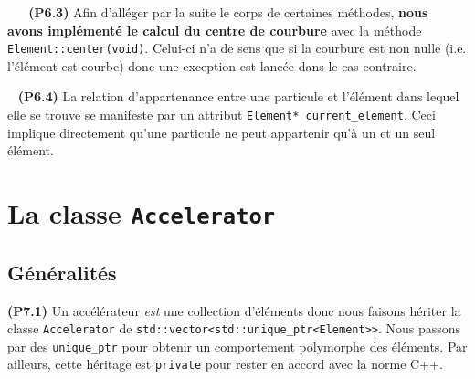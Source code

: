 \documentclass[12pt, letterpaper, twoside]{article}
\newcommand{\T}[1]{\texttt{#1}}
\begin{document}
\ \linebreak
\ \linebreak
\textbf{(P6.3)} Afin d'alléger par la suite le corps de certaines méthodes, \textbf{nous avons implémenté le calcul du centre de courbure} avec la méthode \T{Element::center(void)}. Celui-ci n'a de sens que si la courbure est non nulle (i.e. l'élément est courbe) donc une exception est lancée dans le cas contraire.

\ \linebreak
\textbf{(P6.4)} La relation d'appartenance entre une particule et l'élément dans lequel elle se trouve se manifeste par un attribut \T{Element* current\_element}. Ceci implique directement qu'une particule ne peut appartenir qu'à un et un seul élément.

\section{La classe \T{Accelerator}}

\subsection{Généralités}
\noindent \textbf{(P7.1)} Un accélérateur \textit{est} une collection d'éléments donc nous faisons hériter la classe \T{Accelerator} de \T{std::vector<std::unique\_ptr<Element>>}. Nous passons par des \T{unique\_ptr} pour obtenir un comportement polymorphe des éléments. Par ailleurs, cette héritage est \T{private} pour rester en accord avec la norme C++.
\end{document}
